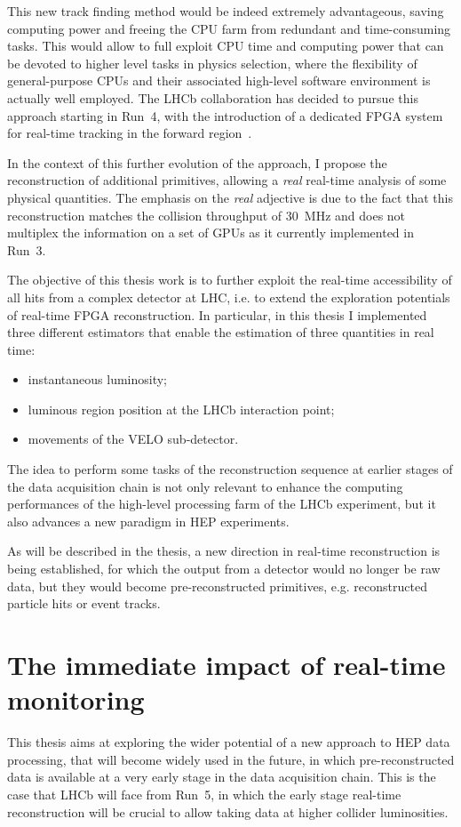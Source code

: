 This new track finding method would be indeed extremely advantageous, saving computing power and freeing the CPU farm from redundant and time-consuming tasks. This would allow to full exploit CPU time and computing power that can be devoted to higher level tasks in physics selection, where the flexibility of general-purpose CPUs and their associated high-level software environment is actually well employed. The LHCb collaboration has decided to pursue this approach starting in Run~4, with the introduction of a dedicated FPGA system for real-time tracking in the forward region~\cite{Morello:2888549}.

In the context of this further evolution of the approach, I propose the reconstruction of additional primitives, allowing a \textit{real} real-time analysis of some physical quantities. The emphasis on the \textit{real} adjective is due to the fact that this reconstruction matches the collision throughput of \SI{30}{\mega\hertz} and does not multiplex the information on a set of GPUs as it currently implemented in Run~3.

The objective of this thesis work is to further exploit the real-time accessibility of all hits from a complex detector at LHC, i.e. to extend the exploration potentials of real-time FPGA reconstruction. In particular, in this thesis I implemented three different estimators that enable the estimation of three quantities in real time:
\begin{itemize}
\item instantaneous luminosity;
\item luminous region position at the LHCb interaction point;
\item movements of the VELO sub-detector.
\end{itemize}

The idea to perform some tasks of the reconstruction sequence at earlier stages of the data acquisition chain is not only relevant to enhance the computing performances of the high-level processing farm of the LHCb experiment, but it also advances a new paradigm in HEP experiments. 

As  will be described in the thesis, a new direction in real-time reconstruction is being established, for which the output from a detector would no longer be raw data, but they would become pre-reconstructed primitives, e.g. reconstructed particle hits or event tracks.
 

\section{The immediate impact of real-time monitoring}
This thesis aims at exploring the wider potential of a new approach to HEP data processing, that will become widely used in the future, in which pre-reconstructed data is available at a very early stage in the data acquisition chain. This is the case that LHCb will face from Run~5, in which the early stage real-time reconstruction will be crucial to allow taking data at higher collider luminosities. 

